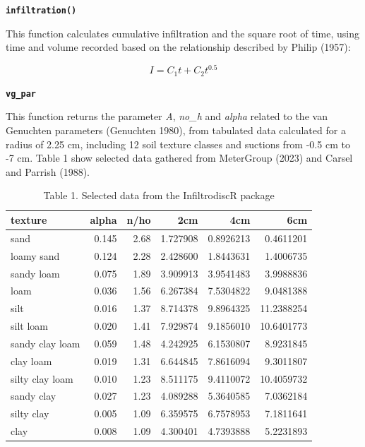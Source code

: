\documentclass[
]{article}
\begin{document}
\textbf{\texttt{infiltration()}}

This function calculates cumulative infiltration and the square root of
time, using time and volume recorded based on the relationship described
by Philip (1957):

\[I = C_{1} t + C_{2} t^{0.5} \]

\textbf{\texttt{vg\_par}}

This function returns the parameter \emph{A}, \emph{no\_h} and
\emph{alpha} related to the van Genuchten parameters (Genuchten 1980),
from tabulated data calculated for a radius of 2.25 cm, including 12
soil texture classes and suctions from -0.5 cm to -7 cm. Table 1 show
selected data gathered from MeterGroup (2023) and Carsel and Parrish
(1988).

\begin{table}

\caption{Table 1. Selected data from the InfiltrodiscR package}
\centering
\begin{tabular}[t]{l|r|r|r|r|r}
\hline
texture & alpha & n/ho & 2cm & 4cm & 6cm\\
\hline
sand & 0.145 & 2.68 & 1.727908 & 0.8926213 & 0.4611201\\
\hline
loamy sand & 0.124 & 2.28 & 2.428600 & 1.8443631 & 1.4006735\\
\hline
sandy loam & 0.075 & 1.89 & 3.909913 & 3.9541483 & 3.9988836\\
\hline
loam & 0.036 & 1.56 & 6.267384 & 7.5304822 & 9.0481388\\
\hline
silt & 0.016 & 1.37 & 8.714378 & 9.8964325 & 11.2388254\\
\hline
silt loam & 0.020 & 1.41 & 7.929874 & 9.1856010 & 10.6401773\\
\hline
sandy clay loam & 0.059 & 1.48 & 4.242925 & 6.1530807 & 8.9231845\\
\hline
clay loam & 0.019 & 1.31 & 6.644845 & 7.8616094 & 9.3011807\\
\hline
silty clay loam & 0.010 & 1.23 & 8.511175 & 9.4110072 & 10.4059732\\
\hline
sandy clay & 0.027 & 1.23 & 4.089288 & 5.3640585 & 7.0362184\\
\hline
silty clay & 0.005 & 1.09 & 6.359575 & 6.7578953 & 7.1811641\\
\hline
clay & 0.008 & 1.09 & 4.300401 & 4.7393888 & 5.2231893\\
\hline
\end{tabular}
\end{table}
\end{document}
